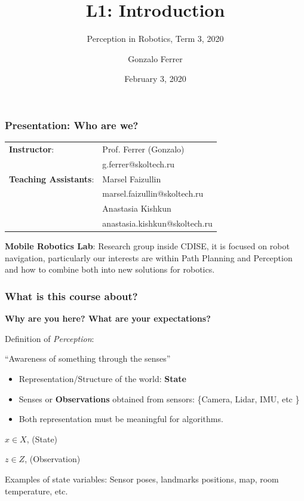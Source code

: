 \documentclass[xetex,mathserif,serif]{beamer} %
\title[L1] %
{L1: Introduction}
\subtitle{Perception in Robotics, Term 3, 2020}
\author %
{Gonzalo Ferrer%
}
\institute[Skoltech] %
{
  Skolkovo Institute of Science and Technology
}
\date %
{February 3, 2020}
\begin{document}
\frame{\titlepage}


\begin{frame}
\frametitle{Presentation: Who are we?}

\begin{tabular}{ l l }
  {\bf Instructor}: & Prof. Ferrer (Gonzalo)  \\
            & g.ferrer@skoltech.ru \\
  {\bf Teaching Assistants}: & Marsel Faizullin  \\
  & marsel.faizullin@skoltech.ru \\
   & Anastasia Kishkun  \\
   & anastasia.kishkun@skoltech.ru 
\end{tabular}

\vspace{5mm}

{\bf Mobile Robotics Lab}: Research group inside CDISE, it is focused on robot navigation, particularly our interests are within Path Planning and Perception and how to combine both into new solutions for robotics.

\end{frame}



\begin{frame}
\frametitle{What is this course about?}


{\bf Why are you here? What are your expectations?}

\pause 
\vspace{5mm}

Definition of {\em Perception}:

``Awareness of something through the senses''



\begin{itemize}
\item Representation/Structure of the world: {\bf State}
\item Senses or {\bf Observations} obtained from sensors: \{Camera, Lidar, IMU, etc \}
\item Both representation must be meaningful for algorithms.
\end{itemize}

\pause
\centering
$x \in X$, (State)
 
\centering
$z \in Z$, (Observation)

\pause
\vspace{2mm}
Examples of state variables: Sensor poses, landmarks positions, map, room temperature, etc.

\end{frame}
\end{document}
